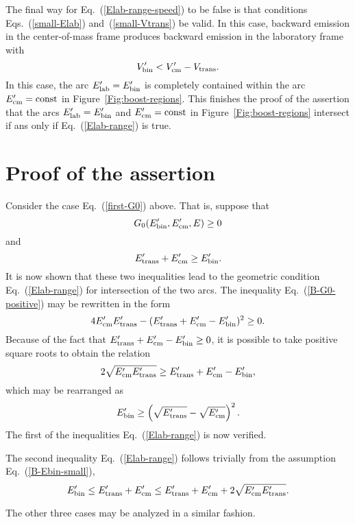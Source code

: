 The final way for Eq.~(\ref{Elab-range-speed}) to be false is that
conditions Eqs.~(\ref{small-Elab}) and~(\ref{small-Vtrans}) be
valid.  In this case, backward emission in the center-of-mass
frame produces backward emission in the laboratory frame with
$$
  V_{\text{bin}}' < V_{\text{cm}}' - V_{\text{trans}}.
$$
In this case, the arc $E_{\text{lab}}' = E_{\text{bin}}'$ is completely contained
within the arc $E_{\text{cm}}' = \text{const}$ in Figure~\ref{Fig:boost-regions}.  This finishes the proof
of the assertion that the arcs $E_{\text{lab}}' = E_{\text{bin}}'$ and $E_{\text{cm}}' = \text{const}$ 
in Figure~\ref{Fig:boost-regions} intersect if ans only if Eq.~(\ref{Elab-range}) is true.

\section{Proof of the assertion}

Consider the case Eq.~(\ref{first-G0}) above.  That is, suppose that
\begin{equation}
   G_0( E_{\text{bin}}',  E_{\text{cm}}', E ) \ge 0
 \label{B-G0-positive}
\end{equation}
and
\begin{equation}
 E_{\text{trans}}' + E_{\text{cm}}' \ge E_{\text{bin}}'.
 \label{B-Ebin-small}
\end{equation}
It is now shown that these two inequalities lead to the geometric
condition Eq.~(\ref{Elab-range}) for intersection of the two arcs.
The inequality Eq.~(\ref{B-G0-positive}) may be rewritten in the form
$$
  4 E_{\text{cm}}' E_{\text{trans}}' - ( E_{\text{trans}}' + E_{\text{cm}}' - E_{\text{bin}}' )^2 \ge 0.
$$
Because of the fact that $E_{\text{trans}}' + E_{\text{cm}}' - E_{\text{bin}}' \ge 0$, 
it is possible to take positive square roots
to obtain the relation
$$
  2 \sqrt{ E_{\text{cm}}' E_{\text{trans}}' } \ge E_{\text{trans}}' + E_{\text{cm}}' - E_{\text{bin}}',
$$
which may be rearranged as
$$
  E_{\text{bin}}' \ge \left( \sqrt{E_{\text{trans}}'} - \sqrt{E_{\text{cm}}'} \right)^2.
$$
The first of the inequalities Eq.~(\ref{Elab-range}) is now verified.

The second inequality Eq.~(\ref{Elab-range}) follows trivially
from the assumption Eq.~(\ref{B-Ebin-small}),
$$
  E_{\text{bin}}' \le E_{\text{trans}}' + E_{\text{cm}}' \le
  E_{\text{trans}}' + E_{\text{cm}}' +  2 \sqrt{ E_{\text{cm}}' E_{\text{trans}}' }.
$$

The other three cases may be analyzed in a similar fashion.
